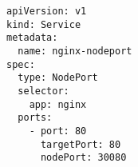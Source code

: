 \begin{verbatim}
apiVersion: v1
kind: Service
metadata:
  name: nginx-nodeport
spec:
  type: NodePort
  selector:
    app: nginx
  ports:
    - port: 80            
      targetPort: 80      
      nodePort: 30080     
\end{verbatim}